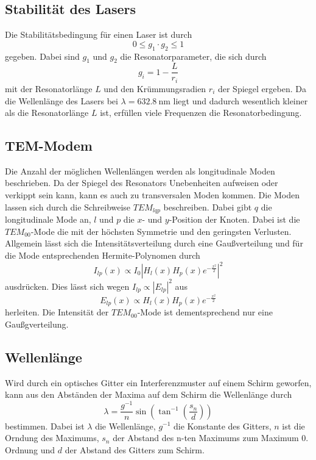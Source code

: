 \subsection{Stabilität des Lasers}
\label{sec:Stabilitaet}
Die Stabilitätsbedingung für einen Laser ist durch
\begin{equation}
    \label{eq:stabil}
    0 \leq g_1 \cdot g_2 \leq 1
\end{equation}
gegeben. Dabei sind $g_1$ und $g_2$ die Resonatorparameter, die sich durch
\begin{equation}
    \label{eq:param}
    g_i = 1 - \frac{L}{r_i}
\end{equation}
mit der Resonatorlänge $L$ und den Krümmungsradien $r_i$ der Spiegel ergeben. Da die Wellenlänge des Lasers
bei $\lambda = \SI{632,8}{\nano\meter}$ liegt und dadurch wesentlich kleiner als die Resonatorlänge $L$ ist,
erfüllen viele Frequenzen die Resonatorbedingung.

\subsection{TEM-Modem}
\label{sec:Moden}
Die Anzahl der möglichen Wellenlängen werden als longitudinale Moden beschrieben. Da der Spiegel des Resonators
Unebenheiten aufweisen oder verkippt sein kann, kann es auch zu transversalen Moden kommen. Die Moden lassen sich
durch die Schreibweise $TEM_{lqp}$ beschreiben. Dabei gibt $q$ die longitudinale Mode an, $l$ und $p$ die $x$-
und $y$-Position der Knoten. Dabei ist die $TEM_{00}$-Mode die mit der höchsten Symmetrie und den geringsten
Verlusten. Allgemein lässt sich die Intensitätsverteilung durch eine Gaußverteilung und für die Mode entsprechenden
Hermite-Polynomen durch
\begin{equation}
    \label{eq:I}
    I_{lp}(x) \propto I_0 |H_{l}(x)H_{p}(x)e^{-\frac{x^2}{2}}|^2
\end{equation}
ausdrücken. Dies lässt sich wegen $I_{lp} \propto |E_{lp}|^2$ aus
\begin{equation}
    E_{lp}(x) \propto H_{l}(x)H_{p}(x)e^{-\frac{x^2}{2}}
\end{equation}
herleiten. Die Intensität der $TEM_{00}$-Mode ist dementsprechend nur eine Gaußgverteilung.

\subsection{Wellenlänge}
\label{sec:Wellenlaenge}
Wird durch ein optisches Gitter ein Interferenzmuster auf einem Schirm geworfen, kann aus den Abständen der
Maxima auf dem Schirm die Wellenlänge durch
\begin{equation}
    \label{eq:winkel}
    \lambda = \frac{g^{-1}}{n} \sin\left(\tan^{-1}\left(\frac{s_n}{d}\right)\right)
\end{equation}
bestimmen. Dabei ist $\lambda$ die Wellenlänge, $g^{-1}$ die Konstante des Gitters, $n$ ist die Orndung des
Maximums, $s_n$ der Abstand des n-ten Maximums zum Maximum 0. Ordnung und $d$ der Abstand des Gitters zum
Schirm.